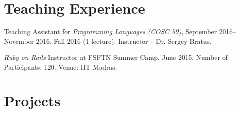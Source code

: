 \documentclass[letterpaper,10pt]{article}
\renewenvironment{itemize}{
  \begin{list}{}{
    \setlength{\leftmargin}{1.5em}
  }
}{
  \end{list}
}
\begin{document}


\section*{Teaching Experience}
\begin{itemize}
\setlength\itemsep{0ex}
\item Teaching Assistant for \textit{Programming Languages (COSC 59)}, September 2016-- November 2016.
		\subitem Fall 2016 (1 lecture). Instructor -- Dr. Sergey Bratus.
\item \textit{Ruby on Rails} Instructor at FSFTN Summer Camp, June 2015.
    \subitem Number of Participants: 120.
    \subitem Venue: IIT Madras.
\end{itemize}



\section*{Projects}
\end{document}
